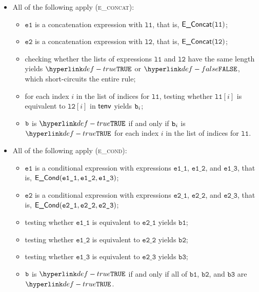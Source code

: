 \documentclass{book}
\newcommand\ProseOrTypeError[0]{\ProseTerminateAs{\TypeErrorConfig}}
\newcommand\veone[0]{\texttt{e1}}
\newcommand\vetwo[0]{\texttt{e2}}
\newcommand\veoneone[0]{\texttt{e1\_1}}
\newcommand\veonetwo[0]{\texttt{e1\_2}}
\newcommand\veonethree[0]{\texttt{e1\_3}}
\newcommand\vetwoone[0]{\texttt{e2\_1}}
\newcommand\vetwotwo[0]{\texttt{e2\_2}}
\newcommand\vetwothree[0]{\texttt{e2\_3}}
\newcommand\vbone[0]{\texttt{b1}}
\newcommand\vbtwo[0]{\texttt{b2}}
\newcommand\vbthree[0]{\texttt{b3}}
\newcommand\vlone[0]{\texttt{l1}}
\newcommand\vltwo[0]{\texttt{l2}}
\begin{document}
\begin{itemize}
  \item All of the following apply (\textsc{e\_concat}):
  \begin{itemize}
    \item $\veone$ is a concatenation expression with $\vlone$, that is, $\EConcat(\vlone)$;
    \item $\vetwo$ is a concatenation expression with $\vltwo$, that is, $\EConcat(\vltwo)$;
    \item checking whether the lists of expressions $\vlone$ and $\vltwo$ have the same length yields
          $\True$ or $\False$, which short-circuits the entire rule;
    \item for each index $i$ in the list of indices for $\vlone$, testing whether $\vlone[i]$ is equivalent to $\vltwo[i]$
          in $\textsf{tenv}$ yields $\texttt{b}_i$\ProseOrTypeError;
    \item $\texttt{b}$ is $\True$ if and only if $\texttt{b}_i$ is $\True$ for each index $i$ in the list of indices for $\vlone$.
  \end{itemize}

  \item All of the following apply (\textsc{e\_cond}):
  \begin{itemize}
    \item $\veone$ is a conditional expression with expressions $\veoneone$, $\veonetwo$, and $\veonethree$,
          that is, $\ECond(\veoneone, \veonetwo, \veonethree)$;
    \item $\vetwo$ is a conditional expression with expressions $\vetwoone$, $\vetwotwo$, and $\vetwothree$,
          that is, $\ECond(\vetwoone, \vetwotwo, \vetwothree)$;
    \item testing whether $\veoneone$ is equivalent to $\vetwoone$ yields $\vbone$\ProseOrTypeError;
    \item testing whether $\veonetwo$ is equivalent to $\vetwotwo$ yields $\vbtwo$\ProseOrTypeError;
    \item testing whether $\veonethree$ is equivalent to $\vetwothree$ yields $\vbthree$\ProseOrTypeError;
    \item $\texttt{b}$ is $\True$ if and only if all of $\vbone$, $\vbtwo$, and $\vbthree$ are $\True$.
  \end{itemize}


\end{itemize}
\end{document}

